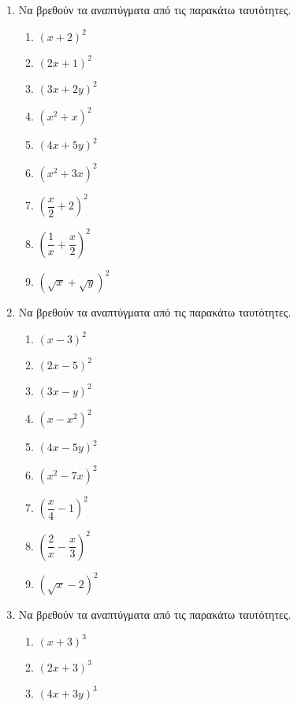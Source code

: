 \documentclass[twoside,nofonts,internet]{askhseis}
\begin{document}
\begin{enumerate}
\item Να βρεθούν τα αναπτύγματα από τις παρακάτω ταυτότητες.
\begin{multicols}{3}
\begin{enumerate}[label=\roman*.]
\item $ \left(x+2 \right)^2 $
\item $ \left(2x+1 \right)^2 $
\item $ \left(3x+2y \right)^2 $
\item $ \left(x^2+x \right)^2 $
\item $ \left(4x+5y \right)^2 $
\item $ \left(x^2+3x \right)^2 $
\item $ \left(\dfrac{x}{2}+2 \right)^2 $
\item $ \left(\dfrac{1}{x}+\dfrac{x}{2} \right)^2 $
\item $ \left(\sqrt{x}+\sqrt{y} \right)^2 $
\end{enumerate}
\end{multicols}
\item Να βρεθούν τα αναπτύγματα από τις παρακάτω ταυτότητες.
\begin{multicols}{3}
\begin{enumerate}[label=\roman*.]
\item $ \left(x-3 \right)^2 $
\item $ \left(2x-5 \right)^2 $
\item $ \left(3x-y \right)^2 $
\item $ \left(x-x^2 \right)^2 $
\item $ \left(4x-5y \right)^2 $
\item $ \left(x^2-7x \right)^2 $
\item $ \left(\dfrac{x}{4}-1 \right)^2 $
\item $ \left(\dfrac{2}{x}-\dfrac{x}{3} \right)^2 $
\item $ \left(\sqrt{x}-2 \right)^2 $
\end{enumerate}
\end{multicols}
\item Να βρεθούν τα αναπτύγματα από τις παρακάτω ταυτότητες.
\begin{multicols}{3}
\begin{enumerate}[label=\roman*.]
\item $ \left(x+3 \right)^3 $
\item $ \left(2x+3 \right)^3 $
\item $ \left(4x+3y \right)^3 $

\end{enumerate}
\end{multicols}
\end{enumerate}
\end{document}
